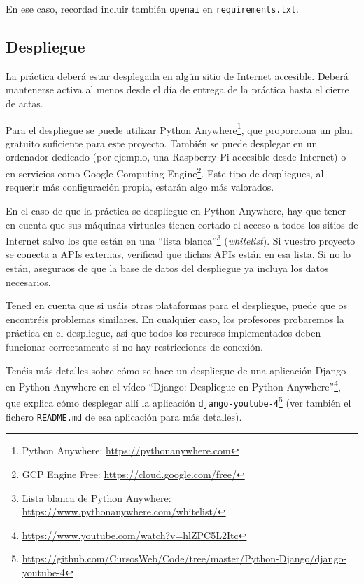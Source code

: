 En ese caso, recordad incluir también \verb|openai| en \verb|requirements.txt|.

\subsection{Despliegue}
\label{sec:practica-2026-05-ltaw:despliegue}

La práctica deberá estar desplegada en algún sitio de Internet accesible. Deberá mantenerse activa al menos desde el día de entrega de la práctica hasta el cierre de actas.

Para el despliegue se puede utilizar Python Anywhere\footnote{Python Anywhere: \url{https://pythonanywhere.com}}, que proporciona un plan gratuito suficiente para este proyecto. También se puede desplegar en un ordenador dedicado (por ejemplo, una Raspberry Pi accesible desde Internet) o en servicios como Google Computing Engine\footnote{GCP Engine Free: \url{https://cloud.google.com/free/}}. Este tipo de despliegues, al requerir más configuración propia, estarán algo más valorados.

En el caso de que la práctica se despliegue en Python Anywhere, hay que tener en cuenta que sus máquinas virtuales tienen cortado el acceso a todos los sitios de Internet salvo los que están en una ``lista blanca''\footnote{Lista blanca de Python Anywhere: \url{https://www.pythonanywhere.com/whitelist/}} (\emph{whitelist}). Si vuestro proyecto se conecta a APIs externas, verificad que dichas APIs están en esa lista. Si no lo están, aseguraos de que la base de datos del despliegue ya incluya los datos necesarios.

Tened en cuenta que si usáis otras plataformas para el despliegue, puede que os encontréis problemas similares. En cualquier caso, los profesores probaremos la práctica en el despliegue, así que todos los recursos implementados deben funcionar correctamente si no hay restricciones de conexión.

Tenéis más detalles sobre cómo se hace un despliegue de una aplicación Django en Python Anywhere en el vídeo ``Django: Despliegue en Python Anywhere''\footnote{\url{https://www.youtube.com/watch?v=hlZPC5L2Itc}}, que explica cómo desplegar allí la aplicación \texttt{django-youtube-4}\footnote{\url{https://github.com/CursosWeb/Code/tree/master/Python-Django/django-youtube-4}} (ver también el fichero \texttt{README.md} de esa aplicación para más detalles).

